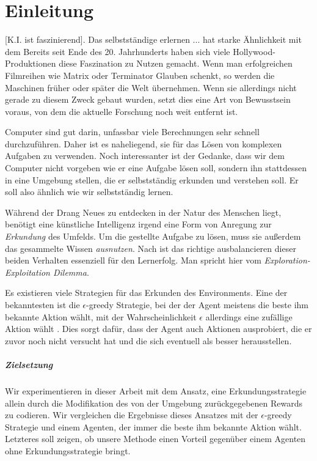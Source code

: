 \chapter{Einleitung} \label{sec:introduction}
[K.I. ist faszinierend]. Das selbstständige erlernen ... hat starke Ähnlichkeit mit dem  Bereits seit Ende des 20. Jahrhunderts haben sich viele Hollywood-Produktionen diese Faszination zu Nutzen gemacht. Wenn man erfolgreichen Filmreihen wie \glqq Matrix\grqq{} oder \glqq Terminator\grqq{} Glauben schenkt, so werden die Maschinen früher oder später die Welt übernehmen. Wenn sie allerdings nicht gerade zu diesem Zweck gebaut wurden, setzt dies eine Art von Bewusstsein voraus, von dem die aktuelle Forschung noch weit entfernt ist. 

Computer sind gut darin, unfassbar viele Berechnungen sehr schnell durchzuführen. Daher ist es naheliegend, sie für das Lösen von komplexen Aufgaben zu verwenden. Noch interessanter ist der Gedanke, dass wir dem Computer nicht vorgeben wie er eine Aufgabe lösen soll, sondern ihn stattdessen in eine Umgebung stellen, die er selbstständig erkunden und verstehen soll. Er soll also ähnlich wie wir selbstständig lernen.

Während der Drang Neues zu entdecken in der Natur des Menschen liegt, benötigt eine künstliche Intelligenz irgend eine Form von Anregung zur \textit{Erkundung} des Umfelds. Um die gestellte Aufgabe zu lösen, muss sie außerdem das gesammelte Wissen \textit{ausnutzen}. Nach \cite{06_sutton2018reinforcement} ist das richtige ausbalancieren dieser beiden Verhalten essenziell für den Lernerfolg. Man spricht hier vom \textit{Exploration-Exploitation Dilemma}.

Es existieren viele Strategien für das Erkunden des Environments. Eine der bekanntesten ist die $ \epsilon $-greedy Strategie, bei der der Agent meistens die beste ihm bekannte Aktion wählt, mit der Wahrscheinlichkeit $ \epsilon $ allerdings eine zufällige Aktion wählt \cite{07_dabney2020temporallyextended}\cite{06_sutton2018reinforcement}. Dies sorgt dafür, dass der Agent auch Aktionen ausprobiert, die er zuvor noch nicht versucht hat und die sich eventuell als besser herausstellen.

\paragraph{Zielsetzung}
Wir experimentieren in dieser Arbeit mit dem Ansatz, eine Erkundungsstrategie allein durch die Modifikation des von der Umgebung zurückgegebenen Rewards zu codieren. Wir vergleichen die Ergebnisse dieses Ansatzes mit der $ \epsilon $-greedy Strategie und einem Agenten, der immer die beste ihm bekannte Aktion wählt. Letzteres soll zeigen, ob unsere Methode einen Vorteil gegenüber einem Agenten ohne Erkundungsstrategie bringt.


